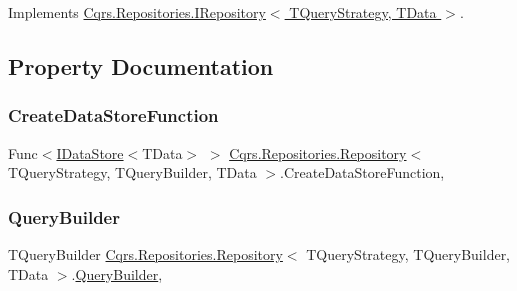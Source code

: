 Implements \hyperlink{interfaceCqrs_1_1Repositories_1_1IRepository_af8a0b1cf5eedd7653d2867ab38657d46_af8a0b1cf5eedd7653d2867ab38657d46}{Cqrs.\+Repositories.\+I\+Repository$<$ T\+Query\+Strategy, T\+Data $>$}.



\subsection{Property Documentation}
\mbox{\label{classCqrs_1_1Repositories_1_1Repository_ae15cee6394a223564ad2ead65cd30189_ae15cee6394a223564ad2ead65cd30189}} 
\subsubsection{\texorpdfstring{Create\+Data\+Store\+Function}{CreateDataStoreFunction}}
{\footnotesize\ttfamily Func$<$\hyperlink{interfaceCqrs_1_1DataStores_1_1IDataStore}{I\+Data\+Store}$<$T\+Data$>$ $>$ \hyperlink{classCqrs_1_1Repositories_1_1Repository}{Cqrs.\+Repositories.\+Repository}$<$ T\+Query\+Strategy, T\+Query\+Builder, T\+Data $>$.Create\+Data\+Store\+Function\hspace{0.3cm}{\ttfamily [get]}, {\ttfamily [protected]}}

\mbox{\label{classCqrs_1_1Repositories_1_1Repository_a4447451b7dbcfcd68dfa3fa65a41f357_a4447451b7dbcfcd68dfa3fa65a41f357}} 
\subsubsection{\texorpdfstring{Query\+Builder}{QueryBuilder}}
{\footnotesize\ttfamily T\+Query\+Builder \hyperlink{classCqrs_1_1Repositories_1_1Repository}{Cqrs.\+Repositories.\+Repository}$<$ T\+Query\+Strategy, T\+Query\+Builder, T\+Data $>$.\hyperlink{classCqrs_1_1Repositories_1_1Queries_1_1QueryBuilder}{Query\+Builder}\hspace{0.3cm}{\ttfamily [get]}, {\ttfamily [protected]}}

